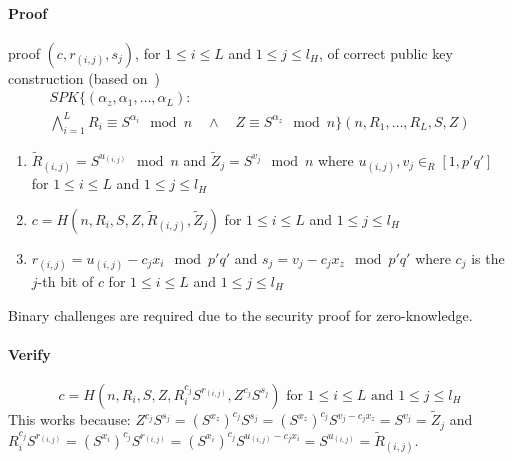 \paragraph{Proof} proof $(c, r_{(i,j)}, s_j)$, for $1 \leq i \leq L$ and
  $1 \leq j \leq l_H$, of correct public key construction (based
  on~\cite[Appendix A]{BrickellCC2004})
\begin{multline*}
  SPK \{ (\alpha_z, \alpha_1, \dots, \alpha_L) : \\
  \bigwedge_{i = 1}^{L} R_i \equiv S^{\alpha_i} \mod n
  \quad\land\quad
  Z \equiv S^{\alpha_z} \mod n
  \} (n, R_1, \dots, R_L, S, Z)
\end{multline*}
\begin{enumerate}
  \item $\tilde{R}_{(i,j)} = S^{u_{(i,j)}} \mod n$ and
    $\tilde{Z}_j = S^{v_j} \mod n$ where
    $u_{(i,j)}, v_j \in_R [1,p'q']$ for
    $1 \leq i \leq L$ and $1 \leq j \leq l_H$
  \item $c = H(n, R_i, S, Z, \tilde{R}_{(i,j)}, \tilde{Z}_j)$ for
    $1 \leq i \leq L$ and $1 \leq j \leq l_H$
  \item $r_{(i,j)} = u_{(i,j)} - c_j x_i \mod p'q'$ and
    $s_j = v_j - c_j x_z \mod p'q'$ where $c_j$ is the $j$-th bit of $c$ for
    $1 \leq i \leq L$ and $1 \leq j \leq l_H$
\end{enumerate}
Binary challenges are required due to the security proof for zero-knowledge.
%
%

\paragraph{Verify}
\begin{equation*}
  c = H(n, R_i, S, Z, R_i^{c_j} S^{r_{(i,j)}}, Z^{c_j} S^{s_j}) \text{ for }
  1 \leq i \leq L \text{ and } 1 \leq j \leq l_H
\end{equation*}
This works because: $Z^{c_j} S^{s_j} = (S^{x_z})^{c_j} S^{s_j} = (S^{x_z})^{c_j} S^{v_j - c_j x_z} = S^{v_j} = \tilde{Z}_j$
and $R_i^{c_j} S^{r_{(i,j)}} = (S^{x_i})^{c_j} S^{r_{(i,j)}} = (S^{x_i})^{c_j} S^{u_{(i,j)}-c_j x_i} = S^{u_{(i,j)}} = \tilde{R}_{(i,j)}$.

